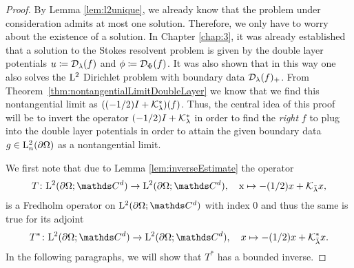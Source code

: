 \begin{proof}
  By Lemma \ref{lem:l2unique}, we already know that the problem under consideration admits at most one solution.
  Therefore, we only have to worry about the existence of a solution.
  In Chapter \ref{chap:3}, it was already established that a solution to the Stokes resolvent problem is given by the double layer potentials $u \coloneqq \mathcal{D}_\lambda(f)$ and $\phi \coloneqq \mathcal{D}_\Phi(f)$.
  It was also shown that in this way one also solves the $\mathrm{L}^2$ Dirichlet problem with boundary data $\mathcal{D}_\lambda(f)_+$.
  From Theorem~\ref{thm:nontangentialLimitDoubleLayer} we know that we find this nontangential limit as $((-1/2)I + \mathcal{K}_\lambda^*)(f)$.
  Thus, the central idea of this proof will be to invert the operator $(-1/2)I + \mathcal{K}_\lambda^*$ in order to find the \emph{right} $f$ to plug into the double layer potentials in order to attain the given boundary data $g \in \mathrm{L}^2_n(\partial\Omega)$ as a nontangential limit.
  
  We first note that due to Lemma \ref{lem:inverseEstimate} the operator
  \begin{align*}
    T \colon \Ell^2(\partial\Omega; \C^d) \to \Ell^2(\partial\Omega; \C^d), \quad\text x \mapsto -(1/2)x  + \K_{\bar \lambda}x,
  \end{align*}
  is a Fredholm operator on $\Ell^2(\partial\Omega; \C^d)$ with index $0$ and thus the same is true for its adjoint 
  \begin{align*}
    T^* \colon \Ell^2(\partial\Omega; \C^d) \to \Ell^2(\partial\Omega; \C^d),\quad x \mapsto  -(1/2)x + \K_{\bar\lambda}^*x.
  \end{align*}
  In the following paragraphs, we will show that $T^*$ has a bounded inverse.


\end{proof}
